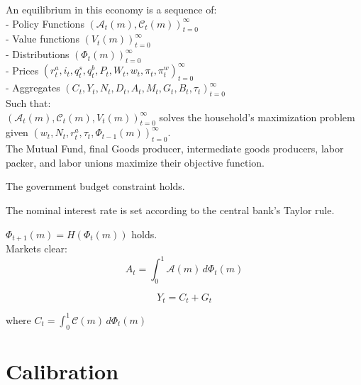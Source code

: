 \documentclass[titlepage]{\econtex}\providecommand{\texname}{BufferStockTheory}
\begin{document}
An equilibrium in this economy is a sequence of: \\

- Policy Functions $\left( \mathcal{A}_{t}(m) , \mathcal{C}_{t}(m) \right )_{t=0}^{\infty}$ \\

- Value functions $ \left( V_{t}(m) \right)_{t=0}^{\infty}$\\

- Distributions $ \left(\Phi_{t}(m) \right)_{t=0}^{\infty}$\\

- Prices $ \left( r^{a}_{t}, i_{t}, q^{s}_{t}, q^{b}_{t}, P_{t}, W_{t} , w_{t} , \pi_{t}, \pi^{w}_{t} \right) _{t=0}^{\infty}$\\

- Aggregates $ \left(C_{t}, Y_{t} , N_{t},D_{t} , A_{t},M_{t},  G_{t} , B_{t}, \tau_{t} \right)_{t=0}^{\infty}$\\

Such that: \\

$ \left( \mathcal{A}_{t}(m) , \mathcal{C}_{t}(m), V_{t}(m)\right)_{t=0}^{\infty}$  solves the household's maximization problem given $  \left( w_{t}, N_{t},  r^{a}_{t}, \tau_{t}, \Phi_{t-1}(m)\right)_{t=0}^{\infty}$.\\

The Mutual Fund, final Goods producer, intermediate goods producers, labor packer, and labor unions maximize their objective function.

The government budget constraint holds.

The nominal interest rate is set according to the central bank's Taylor rule.


$ \Phi_{t+1}(m) = H(\Phi_{t}(m))$ holds.\\


Markets clear:\\

 $$ A_t = \int_{0}^{1} \mathcal{A}(m)\, d\Phi_{t}(m)$$
 
 $$ Y_t = C_{t} +G_{t} $$
 
 where $C_{t} = \int_{0}^{1} \mathcal{C}(m)\, d\Phi_{t}(m)$


\hypertarget{Calibration}{}
\section{Calibration}





\hypertarget{Results}{}
\end{document}
